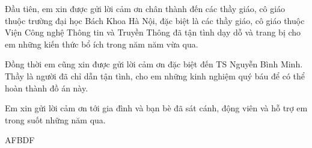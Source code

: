 \cleardoublepage


\begin{acknowledgements}

Đầu tiên, em xin được gửi lời cảm ơn chân thành đến các thầy giáo,
cô giáo thuộc trường đại học Bách Khoa Hà Nội, đặc biệt là các thầy
giáo, cô giáo thuộc Viện Công nghệ Thông tin và Truyền Thông đã tận
tình dạy dỗ và trang bị cho em những kiến thức bổ ích trong năm năm vừa qua.

Đồng thời em cũng xin được gửi lời cảm ơn đặc biệt đến TS Nguyễn Bình Minh.
Thầy là người đã chỉ dẫn tận tình, cho em những kinh nghiệm quý báu
để có thể hoàn thành đồ án này.

Em xin gửi lời cảm ơn tới gia đình và bạn bè đã sát cánh,
động viên và hỗ trợ em trong suốt những năm qua. 

AFBDF

\end{acknowledgements}
